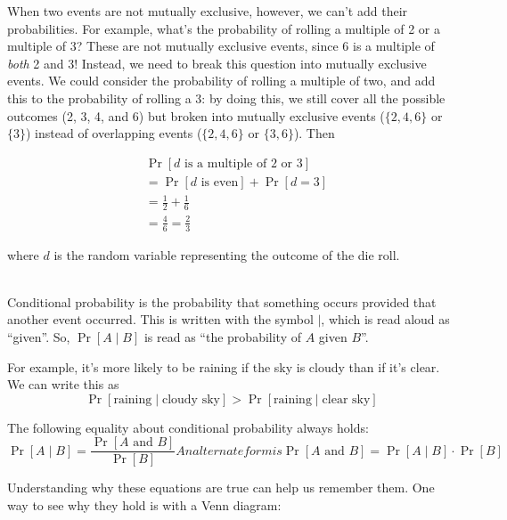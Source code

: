 When two events are not mutually exclusive, however, we can't add 
their probabilities. For example, what's the probability of rolling a 
multiple of 2 or a multiple of 3? These are not mutually exclusive
events, since 6 is a multiple of \emph{both} 2 and 3! Instead, we need 
to break this question into mutually exclusive events. We could consider 
the probability of rolling a multiple of two, and add this to the 
probability of rolling a 3: by doing this, we still cover all the 
possible outcomes (2, 3, 4, and 6) but broken into mutually exclusive 
events ($\{2,4,6\}$ or $\{3\}$) instead of overlapping events ($\{2, 4, 
6\}$ or $\{3, 6\}$). Then

\begin{align*}
    &\Pr[d \text{ is a multiple of 2 or 3}] \\
    &= \Pr[d \text{ is even}] + \Pr[d=3]\\
    &= \frac{1}{2} + \frac{1}{6}\\
    &= \frac{4}{6} = \frac{2}{3}
\end{align*}

where $d$ is the random variable representing the outcome of the die roll.

\hfill\\

Conditional probability is the probability that something occurs 
provided that another event occurred. This is written with the symbol 
$\mid$, which is read aloud as ``given''. So, $\Pr[A \mid B]$ is 
read as ``the probability of $A$ given $B$''.

For example, it's more likely to be raining if the sky is cloudy 
than if it's clear. We can write this as
\[
    \Pr[\text{raining} \mid \text{cloudy sky}] >
    \Pr[\text{raining} \mid \text{clear sky}]
\]

The following equality about conditional probability always holds:
\begin{subequations}\label{eq:conditional}
    \begin{equation}
        \Pr[A \mid B] = \frac{\Pr[A \text{ and } B]}{\Pr[B]}
        \label{eqn:conditional_mid}
    \end{equation}
An alternate form is
    \begin{equation}
        \Pr[A \text{ and } B] = \Pr[A \mid B] \cdot \Pr[B]
        \label{eqn:conditional_and}
    \end{equation}
\end{subequations}

Understanding why these equations are true can help us remember them.
One way to see why they hold is with a Venn diagram:

